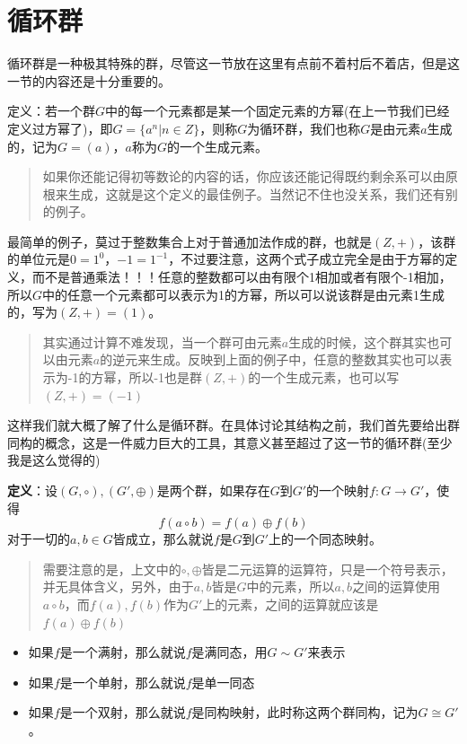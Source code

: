 \documentclass[12pt, a4paper, oneside]{ctexart}
\newenvironment{myquote}{\begin{quote}\small\color{gray}}{\end{quote}}
\begin{document}
\section{循环群}

循环群是一种极其特殊的群，尽管这一节放在这里有点前不着村后不着店，但是这一节的内容还是十分重要的。

定义：若一个群$G$中的每一个元素都是某一个固定元素的方幂(在上一节我们已经定义过方幂了)，即$G=\{a^n|n\in Z\}$，则称$G$为循环群，我们也称$G$是由元素$a$生成的，记为$G=(a)$，$a$称为$G$的一个生成元素。

\begin{myquote}
如果你还能记得初等数论的内容的话，你应该还能记得既约剩余系可以由原根来生成，这就是这个定义的最佳例子。当然记不住也没关系，我们还有别的例子。
\end{myquote}

最简单的例子，莫过于整数集合上对于普通加法作成的群，也就是$(Z,+)$，该群的单位元是$0=1^0$，$-1=1^{-1}$，不过要注意，这两个式子成立完全是由于方幂的定义，而不是普通乘法！！！任意的整数都可以由有限个1相加或者有限个-1相加，所以$G$中的任意一个元素都可以表示为1的方幂，所以可以说该群是由元素1生成的，写为$(Z,+)=(1)$。

\begin{myquote}
其实通过计算不难发现，当一个群可由元素$a$生成的时候，这个群其实也可以由元素$a$的逆元来生成。反映到上面的例子中，任意的整数其实也可以表示为-1的方幂，所以-1也是群$(Z,+)$的一个生成元素，也可以写$(Z,+)=(-1)$
\end{myquote}

这样我们就大概了解了什么是循环群。在具体讨论其结构之前，我们首先要给出群同构的概念，这是一件威力巨大的工具，其意义甚至超过了这一节的循环群(至少我是这么觉得的)

\textbf{定义}：设$(G,\circ),(G',\oplus)$是两个群，如果存在$G$到$G'$的一个映射$f:G\rightarrow G'$，使得
\[
f(a\circ b)=f(a)\oplus f(b)
\]
对于一切的$a,b\in G$皆成立，那么就说$f$是$G$到$G'$上的一个同态映射。

\begin{myquote}
需要注意的是，上文中的$\circ,\oplus$皆是二元运算的运算符，只是一个符号表示，并无具体含义，另外，由于$a,b$皆是$G$中的元素，所以$a,b$之间的运算使用$a\circ b$，而$f(a),f(b)$作为$G'$上的元素，之间的运算就应该是$f(a)\oplus f(b)$
\end{myquote}

\begin{itemize}[leftmargin=*]
\item 如果$f$是一个满射，那么就说$f$是满同态，用$G\sim G'$来表示
\item 如果$f$是一个单射，那么就说$f$是单一同态
\item 如果$f$是一个双射，那么就说$f$是同构映射，此时称这两个群同构，记为$G\cong G'$。
\end{itemize}
\end{document}
